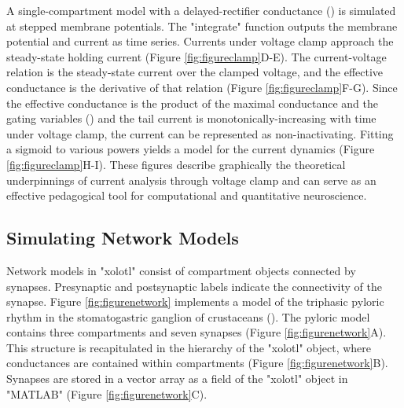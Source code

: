 \documentclass{frontiersSCNS} %
\begin{document}
A single-compartment model with a delayed-rectifier conductance (\cite{liuModelNeuronActivitydependent1998}) is simulated at stepped membrane potentials. The "integrate" function outputs the membrane potential and current as time series. Currents under voltage clamp approach the steady-state holding current (Figure \ref{fig:figureclamp}D-E). The current-voltage relation is the steady-state current over the clamped voltage, and the effective conductance is the derivative of that relation (Figure \ref{fig:figureclamp}F-G). Since the effective conductance is the product of the maximal conductance and the gating variables (\cite{dayanTheoreticalNeuroscience2001, turrigianoSelectiveRegulationCurrent1995}) and the tail current is monotonically-increasing with time under voltage clamp, the current can be represented as non-inactivating. Fitting a sigmoid to various powers yields a model for the current dynamics (Figure \ref{fig:figureclamp}H-I). These figures describe graphically the theoretical underpinnings of current analysis through voltage clamp and can serve as an effective pedagogical tool for computational and quantitative neuroscience.

%
%
%
%
%
%

\subsection{Simulating Network Models}

Network models in "xolotl" consist of compartment objects connected by synapses. Presynaptic and postsynaptic labels indicate the connectivity of the synapse. Figure \ref{fig:figurenetwork} implements a model of the triphasic pyloric rhythm in the stomatogastric ganglion of crustaceans (\cite{prinzSimilarNetworkActivity2004}). The pyloric model contains three compartments and seven synapses (Figure \ref{fig:figurenetwork}A). This structure is recapitulated in the hierarchy of the "xolotl" object, where conductances are contained within compartments (Figure \ref{fig:figurenetwork}B). Synapses are stored in a vector array as a field of the "xolotl" object in "MATLAB" (Figure \ref{fig:figurenetwork}C).

%
%
%
%
%
%
\end{document}
